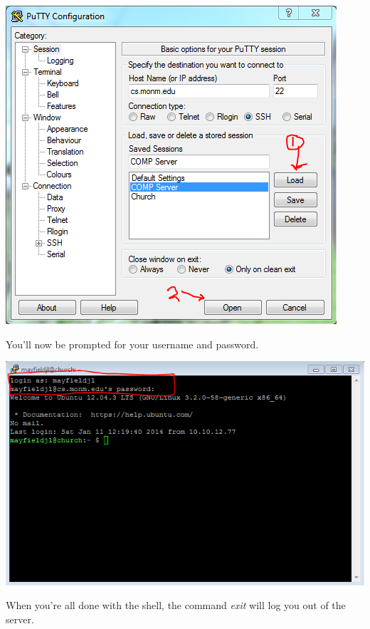 \documentclass[nobib]{tufte-handout}
\begin{document}
\vspace{.1in}
\begin{center}
\includegraphics[scale=.75]{Putty-LoadAndOpen.png}
\end{center}
\vspace{.1in}

You'll now be prompted for your username and password.

\vspace{.1in}
\begin{center}
\includegraphics[scale=.75]{Putty-Login.png}
\end{center}
\vspace{.1in}

When you're all done with the shell, the command \textit{exit} will log you out of the server.
\end{document}
